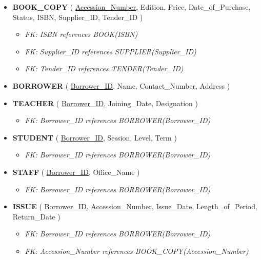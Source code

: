 \documentclass[12pt,a3paper]{article}
\begin{document}
\begin{enumerate}
\begin{tcolorbox}[enhanced,breakable,ansbox,colback=cA!4,colframe=cA,boxrule=0.8pt,arc=5pt,title={\textbf{Answer}},fonttitle=\bfseries\color{white},colbacktitle=cA]
\begin{itemize}[leftmargin=1.5em, itemsep=1em]
    \item \textbf{BOOK\_COPY} ( \underline{Accession\_Number}, Edition, Price, Date\_of\_Purchase, Status, ISBN, Supplier\_ID, Tender\_ID )
        \begin{itemize}[label={--}, noitemsep, topsep=2pt]
            \item \textit{FK: ISBN references BOOK(ISBN)}
            \item \textit{FK: Supplier\_ID references SUPPLIER(Supplier\_ID)}
            \item \textit{FK: Tender\_ID references TENDER(Tender\_ID)}
        \end{itemize}
        
    \item \textbf{BORROWER} ( \underline{Borrower\_ID}, Name, Contact\_Number, Address )
    
    \item \textbf{TEACHER} ( \underline{Borrower\_ID}, Joining\_Date, Designation )
        \begin{itemize}[label={--}, noitemsep, topsep=2pt]
            \item \textit{FK: Borrower\_ID references BORROWER(Borrower\_ID)}
        \end{itemize}
        
    \item \textbf{STUDENT} ( \underline{Borrower\_ID}, Session, Level, Term )
        \begin{itemize}[label={--}, noitemsep, topsep=2pt]
            \item \textit{FK: Borrower\_ID references BORROWER(Borrower\_ID)}
        \end{itemize}
        
    \item \textbf{STAFF} ( \underline{Borrower\_ID}, Office\_Name )
        \begin{itemize}[label={--}, noitemsep, topsep=2pt]
            \item \textit{FK: Borrower\_ID references BORROWER(Borrower\_ID)}
        \end{itemize}

    \item \textbf{ISSUE} ( \underline{Borrower\_ID}, \underline{Accession\_Number}, \underline{Issue\_Date}, Length\_of\_Period, Return\_Date )
        \begin{itemize}[label={--}, noitemsep, topsep=2pt]
            \item \textit{FK: Borrower\_ID references BORROWER(Borrower\_ID)}
            \item \textit{FK: Accession\_Number references BOOK\_COPY(Accession\_Number)}
        \end{itemize}
\end{itemize}


\end{tcolorbox}
\end{enumerate}
\end{document}
